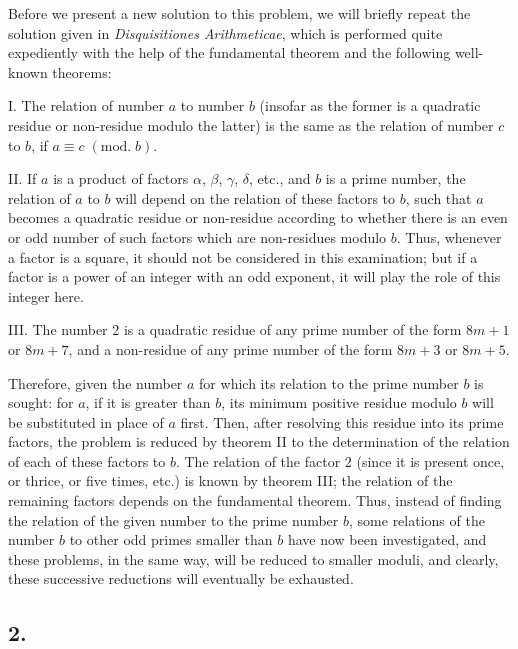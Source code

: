 \documentclass[twoside,12pt, showframe]{memoir}
\renewcommand{\pmod}[1]{\;(\textrm{mod.}\;#1)}
\begin{document}
Before we present a new solution to this problem, we will briefly repeat the solution given in \textit{Disquisitiones Arithmeticae}, which is performed quite expediently with the help of the fundamental theorem and the following well-known theorems:

I. The relation of number \(a\) to number \(b\) (insofar as the former is a quadratic residue or non-residue modulo the latter) is the same as the relation of number \(c\) to \(b\), if \(a \equiv c\pmod{b}\).

II. If \(a\) is a product of factors \(\alpha\), \(\beta\), \(\gamma\), \(\delta\), etc., and \(b\) is a prime number, the relation of \(a\) to \(b\) will depend on the relation of these factors to \(b\), such that \(a\) becomes a quadratic residue or non-residue according to whether there is an even or odd number of such factors which are non-residues modulo \(b\). Thus, whenever a factor is a square, it should not be considered in this examination; but if a factor is a power of an integer with an odd exponent, it will play the role of this integer here.

III. The number 2 is a quadratic residue of any prime number of the form \(8m+1\) or \(8m+7\), and a non-residue of any prime number of the form \(8m+3\) or \(8m+5\).%

Therefore, given the number \(a\) for which its relation to the prime number \(b\) is sought: for \(a\), if it is greater than \(b\), its minimum positive residue modulo \(b\) will be substituted in place of \(a\) first. Then, after resolving this residue into its prime factors, the problem is reduced by theorem II to the determination of the relation of each of these factors to \(b\). The relation of the factor 2 (since it is present once, or thrice, or five times, etc.) is known by theorem III; the relation of the remaining factors depends on the fundamental theorem. Thus, instead of finding the relation of the given number to the prime number \(b\), some relations of the number \(b\) to other odd primes smaller than \(b\) have now been investigated, and these problems, in the same way, will be reduced to smaller moduli, and clearly, these successive reductions will eventually be exhausted.
%

\subsection*{2.}
\end{document}
